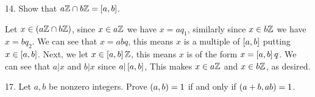 \begin{mdframed}[style=darkAnswer,frametitle={Joe Starr}]
    
\end{mdframed}
\newpage
\begin{mdframed}[style=darkQuesion]
14. Show that $a\mathbb{Z} \cap b\mathbb{Z}=\left[a,b\right]$.
\end{mdframed}

\begin{mdframed}[style=darkAnswer,frametitle={Joe Starr}]
    Let $x\in \left(a\mathbb{Z} \cap b\mathbb{Z}\right)$, since $x\in a\mathbb{Z}$ we have $x=aq_1$, similarly 
    since $x\in b\mathbb{Z}$ we have$x=bq_2$. We can see that $x=abq$, this means $x$ 
    is a multiple of $\left[a,b\right]$ putting $x\in \left[a,b\right]$. Next, we let 
    $x\in \left[a,b\right]\mathbb{Z}$, this means $x$ is of the form $x=\left[a,b\right]q$. We can see
    that $a\vert x$ and $b\vert x$ since $a\vert \left[a,b\right]$, This makes 
    $x\in a\mathbb{Z}$ and $x\in b\mathbb{Z}$, as desired. 
\end{mdframed}
\newpage
\begin{mdframed}[style=darkQuesion]
17. Let $a,b$ be nonzero integers. Prove $\left(a,b\right)=1$ if and only if 
$\left(a+b,ab\right)=1$. 
\end{mdframed}

